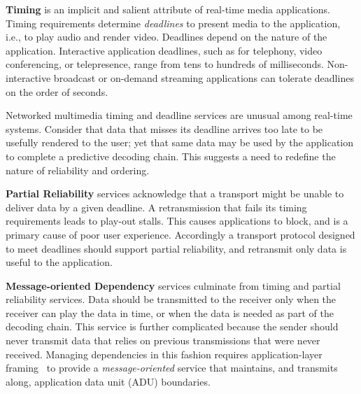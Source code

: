 \textbf{Timing} is an implicit and salient attribute of real-time media
applications. Timing requirements determine {\em deadlines} to present media to
the application, i.e., to play audio and render video. Deadlines depend on the
nature of the application. Interactive application deadlines, such as for
telephony, video conferencing, or telepresence, range from tens to hundreds of
milliseconds. Non-interactive broadcast or on-demand streaming applications can
tolerate deadlines on the order of seconds.

Networked multimedia timing and deadline services are unusual among real-time systems. Consider that data that misses its deadline arrives too late to be usefully rendered to the user; yet that same data may be used by the application to complete a predictive decoding chain. This suggests a need to redefine the nature of reliability and ordering.


\textbf{Partial Reliability} services acknowledge that a transport might be unable to
deliver data by a given deadline. A retransmission that fails its timing
requirements leads to play-out stalls. This causes applications to block, and is
a primary cause of poor user experience. Accordingly a transport protocol
designed to meet deadlines should support partial reliability, and retransmit
only data is useful to the application.


\textbf{Message-oriented Dependency} services culminate from timing and partial
reliability services. Data should be transmitted to the receiver only when the
receiver can play the data in time, or when the data is needed as part of the
decoding chain. This service is further complicated because the sender should
never transmit data that relies on previous transmissions that were never
received. Managing dependencies in this fashion requires application-layer
framing~\cite{clark:1990:architecture} to provide a {\em message-oriented}
service that maintains, and transmits along, application data unit (ADU)
boundaries.

